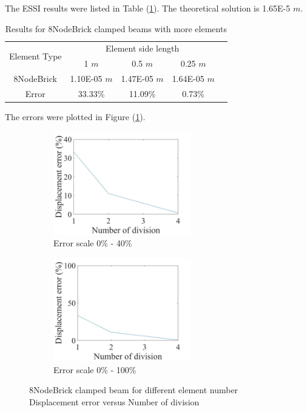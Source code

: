 \documentclass[fleqn,11pt,letter]{article}
\begin{document}
The ESSI results were listed in Table (\ref{table Results for 8NodeBrick clamped beams with more elements}). 
The theoretical solution is 1.65E-5 $m$. 

\begin{table}[H]
  \centering
  \caption{Results for 8NodeBrick clamped beams with more elements}
  \label{table Results for 8NodeBrick clamped beams with more elements}
  \begin{tabular}{|c|c|c|c|c|}
    \hline 
    \multirow{2}{*}{Element Type} 
       & \multicolumn{3}{|c|}{Element side length} \\ \cline{2-4}
       & 1 $m$ & 0.5 $m$ & 0.25 $m$ \\                              \hline
8NodeBrick & 1.10E-05 $m$ & 1.47E-05 $m$ & 1.64E-05 $m$ \\ \hline
Error      & 33.33\%  & 11.09\%  & 0.73\%   \\ \hline
  \end{tabular}
\end{table}

The errors were plotted in Figure (\ref{fig error 8NodeBrick clamped beam for different element number}).

\begin{figure}[H]
  \begin{subfigure}{0.5\textwidth}
    \centering
    \includegraphics[width=6cm]{../Figure_files/8NodeBrick/error8brick_clamped_beam_diff_element.jpeg}
    \caption{Error scale 0\% - 40\%}
  \end{subfigure}
  \begin{subfigure}{0.5\textwidth}
    \centering
    \includegraphics[width=6cm]{../Figure_files/8NodeBrick/error8brick_clamped_beam_diff_element100.jpeg}
    \caption{Error scale 0\% - 100\%}
  \end{subfigure}
  \captionsetup{justification=centering,margin=3cm}
  \caption{8NodeBrick clamped beam for different element number\\
      Displacement error   versus   Number of division}
  \label{fig error 8NodeBrick clamped beam for different element number}
\end{figure}
\end{document}
